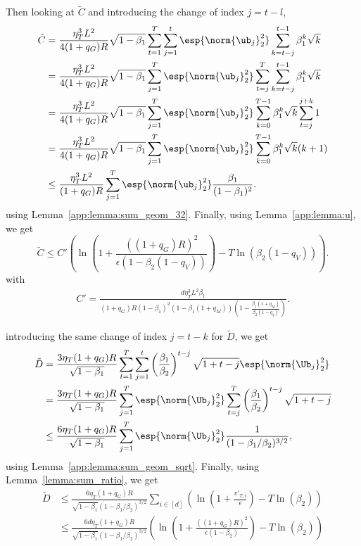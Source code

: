 \documentclass[11pt, letterpaper]{article}
\begin{document}
Then looking at $\tilde{C}$ and introducing the change of index $j=t -l$,
\begin{align}
\nonumber
    \tilde{C} &= \frac{\eta_T^3 L^2}{4 (1+q_G)R}\sqrt{1-\beta_1}  \sum_{t=1}^T \sum_{j=1}^{t}
    \esp{\norm{\ub_{j}}^2_2}\sum_{k=t - j}^{t-1} \beta_1^k \sqrt{k} \\
\nonumber
    &= \frac{\eta_T^3 L^2}{4 (1+q_G)R}\sqrt{1-\beta_1}  \sum_{j=1}^T \esp{\norm{\ub_{j}}^2_2}\sum_{t=j}^{T}
    \sum_{k=t - j}^{t-1} \beta_1^k \sqrt{k}\\
\nonumber
    &= \frac{\eta_T^3 L^2}{4 (1+q_G)R}\sqrt{1-\beta_1}  \sum_{j=1}^T \esp{\norm{\ub_{j}}^2_2}
    \sum_{k=0}^{T-1} \beta_1^k \sqrt{k}\sum_{t=j}^{j + k} 1\\
\nonumber
    &= \frac{\eta_T^3 L^2}{4 (1+q_G)R}\sqrt{1-\beta_1} \sum_{j=1}^T \esp{\norm{\ub_{j}}^2_2}
    \sum_{k=0}^{T-1} \beta_1^k \sqrt{k} (k + 1)\\
    &\leq \frac{\eta_T^3 L^2}{(1+q_G)R}  \sum_{j=1}^T \esp{\norm{\ub_{j}}^2_2} \frac{\beta_1}{(1 - \beta_1)^{2}}.
\end{align}
using Lemma~\ref{app:lemma:sum_geom_32}. Finally, using Lemma~\ref{app:lemma:u}, we get
\begin{equation}
    \tilde{C} \leq  C' \left(\ln\left(1 + \frac{((1+q_G)R)^2}{\epsilon(1-\beta_2(1-q_V))}\right) - T\ln(\beta_2(1-q_V))\right).  
    \label{app:eq:common_c_bound_main}
\end{equation}
with
\begin{gather}
    C'=\frac{d\eta_T^3 L^2 \beta_1}{(1+q_G)R (1 - \beta_1)^{2}(1 - \beta_1(1+q_M))(1 - \frac{\beta_1(1+q_M)}{\beta_2(1-q_V)})}.
\end{gather}

introducing the same change of index $j = t-k$ for $\tilde{D}$, we get
\begin{align}
\nonumber
    \tilde{D} &= \frac{3 \eta_T (1+q_G)R}{\sqrt{1-\beta_1}} \sum_{t=1}^T \sum_{j=1}^t \left(\frac{\beta_1}{\beta_2}\right)^{t -j } \sqrt{1 + t - j} \esp{\norm{\Ub_j}_2^2}\\
\nonumber
        &= \frac{3 \eta_T (1+q_G)R}{\sqrt{1-\beta_1}} \sum_{j=1}^T \esp{\norm{\Ub_j}_2^2} \sum_{t=j}^T \left(\frac{\beta_1}{\beta_2}\right)^{t -j } \sqrt{1 + t - j}\\
        &\leq\frac{6 \eta_T (1+q_G)R}{\sqrt{1-\beta_1}}\sum_{j=1}^T \esp{\norm{\Ub_j}_2^2} \frac{1}{(1 - \beta_1 / \beta_2)^{3/2}}, 
\end{align}
using Lemma~\ref{app:lemma:sum_geom_sqrt}. Finally, using Lemma~\ref{lemma:sum_ratio}, we get 
\begin{align}
    \nonumber
    \tilde{D} &\leq  \frac{6 \eta_T (1+q_G)R }{\sqrt{1 - \beta_1}(1 - \beta_1 / \beta_2)^{3/2}} \sum_{i\in[d]}\left( \ln\left(1 + \frac{v'_{T, i}}{\epsilon}\right) - T \ln(\beta_2)\right)\\
    &\le \frac{6d \eta_T (1+q_G)R }{\sqrt{1 - \beta_1}(1 - \beta_1 / \beta_2)^{3/2}} \left( \ln\left(1 + \frac{((1+q_G)R)^2}{\epsilon(1-\beta_2)}\right) - T \ln(\beta_2)\right)
    \label{app:eq:common_d_bound_main}
\end{align}
\end{document}

